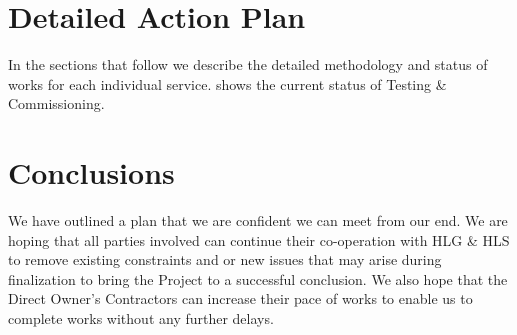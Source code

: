 \section*{Detailed Action Plan}

In the sections that follow we describe the detailed methodology and status of works for each individual service.  shows the current status of Testing \& Commissioning.



\section*{Conclusions}

We have outlined a plan that we are confident we can meet from our end. We are hoping that all parties involved can continue their co-operation with HLG \& HLS to remove existing constraints and or new issues that may arise during finalization to bring the Project to a successful conclusion. We also hope that the Direct Owner's Contractors can increase their pace of works to enable us to complete works without any further delays.



